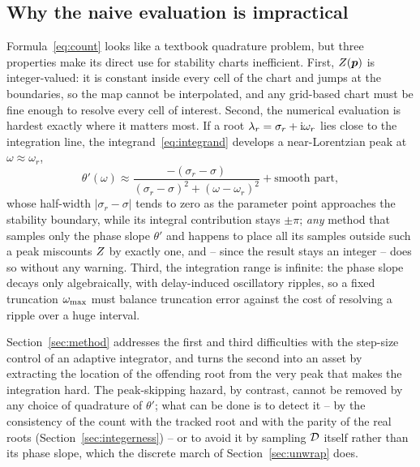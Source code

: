 \subsection{Why the naive evaluation is impractical}\label{sec:naive}

Formula~\eqref{eq:count} looks like a textbook quadrature problem, but three
properties make its direct use for stability charts inefficient.
First, $Z(\boldsymbol{p})$ is integer-valued: it is constant inside every cell
of the chart and jumps at the boundaries, so the map cannot be interpolated,
and any grid-based chart must be fine enough to resolve every cell of
interest. Second, the numerical evaluation is hardest exactly where it
matters most. If a root $\lambda_r=\sigma_r+\mathrm{i}\omega_r$ lies close to the
integration line, the integrand~\eqref{eq:integrand} develops a
near-Lorentzian peak at $\omega\approx\omega_r$,
\begin{equation}\label{eq:peak}
  \theta'(\omega) \approx \frac{-(\sigma_r-\sigma)}
  {(\sigma_r-\sigma)^{2} + (\omega-\omega_r)^{2}} + \text{smooth part},
\end{equation}
whose half-width $|\sigma_r-\sigma|$ tends to zero as the parameter point
approaches the stability boundary, while its integral contribution stays
$\pm\pi$; \emph{any} method that samples only the phase slope $\theta'$ and
happens to place all its samples outside such a peak miscounts $Z$ by
exactly one, and -- since the result stays an integer -- does so without any
warning. Third, the integration range is infinite: the phase
slope decays only algebraically, with delay-induced oscillatory ripples, so a
fixed truncation $\omega_{\mathrm{max}}$ must balance truncation error against the cost of
resolving a ripple over a huge interval.

Section~\ref{sec:method} addresses the first and third difficulties with the
step-size control of an adaptive integrator, and turns the second into an
asset by extracting the location of the offending root from the very peak
that makes the integration hard. The peak-skipping hazard, by contrast,
cannot be removed by any choice of quadrature of $\theta'$; what can be done
is to detect it -- by the consistency of the count with the tracked root and
with the parity of the real roots (Section~\ref{sec:integerness}) -- or to
avoid it by sampling $\mathcal{D}$ itself rather than its phase slope, which the
discrete march of Section~\ref{sec:unwrap} does.